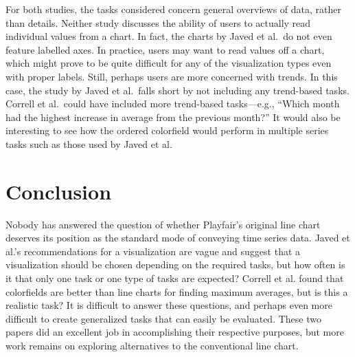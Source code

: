 \documentclass{article} %
\begin{document}
For both studies, the tasks considered concern general overviews of data, rather than details.  Neither study discusses the ability of users to actually read individual values from a chart.  In fact, the charts by Javed et al.\ do not even feature labelled axes.  In practice, users may want to read values off a chart, which might prove to be quite difficult for any of the visualization types even with proper labels.  Still, perhaps users are more concerned with trends.  In this case, the study by Javed et al.\ falls short by not including any trend-based tasks.  Correll et al.\ could have included more trend-based tasks---e.g., ``Which month had the highest increase in average from the previous month?''  It would also be interesting to see how the ordered colorfield would perform in multiple series tasks such as those used by Javed et al.

\section{Conclusion}

Nobody has answered the question of whether Playfair's original line chart deserves its position as the standard mode of conveying time series data.  Javed et al.'s recommendations for a visualization are vague and suggest that a visualization should be chosen depending on the required tasks, but how often is it that only one task or one type of tasks are expected?  Correll et al. found that colorfields are better than line charts for finding maximum averages, but is this a realistic task?  It is difficult to answer these questions, and perhaps even more difficult to create generalized tasks that can easily be evaluated.  These two papers did an excellent job in accomplishing their respective purposes, but more work remains on exploring alternatives to the conventional line chart.




\end{document}
